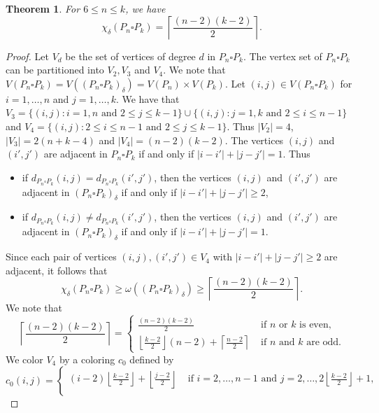 \documentclass[12pt]{amsart}
\newtheorem{theorem}{Theorem}
\begin{document}
\begin{theorem}
\label{thm: pathpath}
    For $6\leq n\leq k$, we have 
    \[
\chi_{\delta}(P_{n}\square P_{k})=\left\lceil\frac{(n-2)(k-2)}{2}\right\rceil.
\]
\end{theorem}
\begin{proof}
    Let $V_{d}$ be the set of vertices of degree $d$ in $P_n\square P_k$.
    The vertex set of $P_n\square P_k$ can be partitioned into $V_2, V_3$ and $V_4$.
    We note that $V(P_n\square P_k)=V((P_n\square P_k)_\delta)=V(P_n)\times V(P_k)$.
    Let $(i,j)\in V(P_n\square P_k)$ for $i=1,\dots,n$ and $j=1,\dots,k$.
    We have that $V_3=\{(i,j): i=1,n \text{ and } 2\leq j\leq k-1\}\cup\{(i,j):j=1,k \text{ and } 2\leq i\leq n-1\}$ and $V_4=\{(i,j): 2\leq i\leq n-1 \text{ and } 2\leq j\leq k-1\}$.
    Thus $|V_2|=4$, $|V_3|=2(n+k-4)$ and $|V_4|=(n-2)(k-2)$.
   The vertices $(i,j)$ and $(i',j')$ are adjacent in $P_n\square P_k$ if and only if $|i-i'|+|j-j'|=1$.
    Thus 
    \begin{itemize}
        \item if $d_{P_n\square P_k}(i,j)=d_{P_n\square P_k}(i',j')$, then the vertices $(i,j)$ and $(i',j')$ are adjacent in $(P_n\square P_k)_\delta$ if and only if $|i-i'|+|j-j'|\geq 2$,
        \item if $d_{P_n\square P_k}(i,j)\neq d_{P_n\square P_k}(i',j')$, then the vertices $(i,j)$ and $(i',j')$ are adjacent in $(P_n\square P_k)_\delta$ if and only if $|i-i'|+|j-j'|=1$.
    \end{itemize}
Since each pair of vertices $(i,j),(i',j')\in V_4$ with $|i-i'|+|j-j'|\geq 2$ are adjacent, it follows that
\[
\chi_{\delta}(P_n\square P_k)\geq \omega((P_n\square P_k)_\delta)\geq \left\lceil\frac{(n-2)(k-2)}{2}\right\rceil.
\]
We note that
\[
\left\lceil\frac{(n-2)(k-2)}{2}\right\rceil=
\begin{cases} 
\frac{(n-2)(k-2)}{2} &\text{ if } n \text{ or } k \text{ is even},\\
\left\lfloor\frac{k-2}{2}\right\rfloor(n-2)+\left\lceil\frac{n-2}{2}\right\rceil &\text{ if } n \text{ and } k \text{ are odd}.
\end{cases}
\]
    We color $V_4$ by a coloring $c_0$ defined by
    \[
    c_0(i,j)=
    \begin{cases}
        (i-2)\left\lfloor\frac{k-2}{2}\right\rfloor+\left\lfloor\frac{j-2}{2}\right\rfloor &\text{ if } i=2,\dots,n-1 \text{ and } j=2,\dots,2\left\lfloor\frac{k-2}{2}\right\rfloor+1,\\
    

\end{cases}\]
\end{proof}
\end{document}
